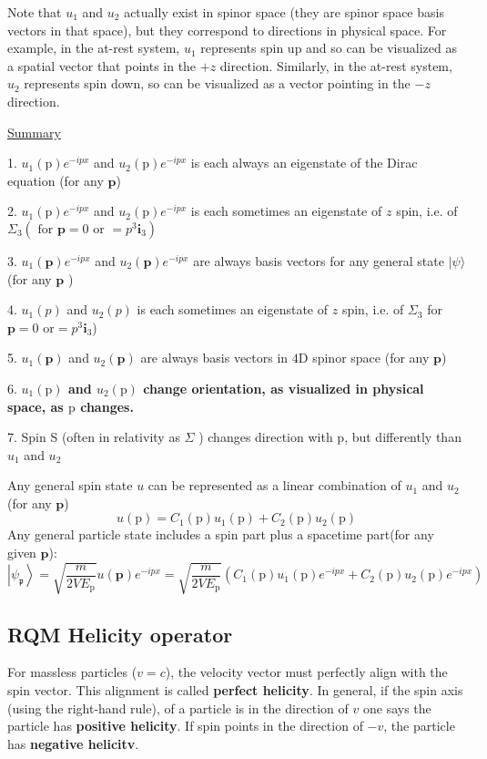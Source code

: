 Note that $u_{1}$ and $u_{2}$ actually exist in spinor space (they are spinor space basis vectors in that space), but they correspond to directions in physical space. For example, in the at-rest system, $u_1$ represents spin up and so can be visualized as a spatial vector that points in the $+z$ direction. Similarly, in the at-rest system, $u_{2}$ represents spin down, so can be visualized as a vector pointing in the $-z$ direction. 
\begin{qt}
\underline{Summary}

1. $u_{1}(\mathrm{p}) e^{-i p x}$ and  $u_{2}(\mathrm{p}) e^{-i p x}$ is each always an eigenstate of the Dirac equation (for any $\mathbf{p}$)

2. $u_{1}(\mathrm{p}) e^{-i p x}$ and $u_{2}(\mathrm{p}) e^{-i p x}$ is each sometimes an eigenstate of $z$ spin, i.e. of $\Sigma_{3}\left(\text { for } \mathbf{p}=0 \text { or }=p^{3} \mathbf{i}_{3}\right)$

3. $u_{1}(\mathbf{p}) e^{-i p x}$ and $u_{2}(\mathbf{p}) e^{-i p x}$ are always basis vectors for any general state $|\psi\rangle$ (for any $\mathbf{p}$ )

4. $u_{1}(p)$ and $u_{2}(p)$ is each sometimes an eigenstate of $z$ spin, i.e. of $\Sigma_{3}$ for $\mathbf{p}=0$ or$=p^{3} \mathbf{i}_{3}$)

5. $u_{1}(\mathbf{p})$ and $u_{2}(\mathbf{p})$ are always basis vectors in $4 \mathrm{D}$ spinor space (for any $\mathbf{p}$) 

6. \textbf{$u_{1}(\mathrm{p})$ and $u_{2}(\mathrm{p})$ change orientation, as visualized in physical space, as $\mathrm{p}$ changes.}

7. Spin S (often in relativity as $\Sigma$ ) changes direction with p, but differently than $u_{1}$ and $u_{2}$
\end{qt}
Any general spin state $u$ can be represented as a linear combination of $u_{1}$ and  $u_{2}$ (for any $\mathbf{p}$)
$$
u(\mathrm{p})=C_{1}(\mathrm{p}) u_{1}(\mathrm{p})+C_{2}(\mathrm{p}) u_{2}(\mathrm{p})
$$
Any general particle state includes a spin part plus a spacetime part(for any given $\mathbf{p}$):
$$
\left|\psi_{\mathfrak{p}}\right\rangle=\sqrt{\frac{m}{2 V E_{\mathrm{p}}}} u(\mathbf{p}) e^{-i p x}=\sqrt{\frac{m}{2 V E_{\mathrm{p}}}}\left(C_{1}(\mathrm{p}) u_{1}(\mathrm{p}) e^{-i p x}+C_{2}(\mathrm{p}) u_{2}(\mathrm{p}) e^{-i p x}\right)
$$
\subsection{RQM Helicity operator}
For massless particles ($v=c$), the velocity vector must perfectly align with the spin vector. This alignment is called \textbf{perfect helicity}. In general, if the spin axis (using the right-hand rule), of a particle is in the direction of $v$ one
says the particle has \textbf{positive helicity}. If spin points in the direction of $- v$, the particle has \textbf{negative helicitv}. 

